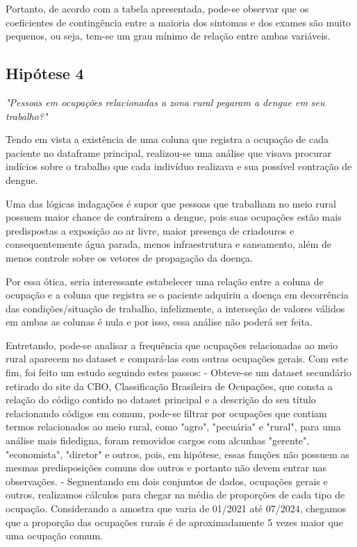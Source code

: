 \documentclass[a4paper,12pt]{article}
\begin{document}
Portanto, de acordo com a tabela apresentada, pode-se observar que os coeficientes de contingência entre a maioria dos sintomas e dos exames são muito pequenos, ou seja, tem-se um grau mínimo de relação entre ambas variáveis.


\subsection{Hipótese 4}
\emph{"Pessoas em ocupações relacionadas a zona rural pegaram a dengue em seu trabalho?"}

Tendo em vista a existência de uma coluna que registra a ocupação de cada paciente no dataframe principal, realizou-se uma análise que visava procurar indícios sobre o trabalho que cada indivíduo realizava e sua possível contração de dengue. 

Uma das lógicas indagações é supor que pessoas que trabalham no meio rural possuem maior chance de contraírem a dengue, pois suas ocupações estão mais predispostas a exposição ao ar livre, maior presença de criadouros e consequentemente água parada, menos infraestrutura e saneamento, além de menos controle sobre os vetores de propagação da doença.

Por essa ótica, seria interessante estabelecer uma relação entre a coluna de ocupação e a coluna que registra se o paciente adquiriu a doença em decorrência das condições/situação de trabalho, infelizmente, a interseção de valores válidos em ambas as colunas é nula e por isso, essa análise não poderá ser feita.

Entretando, pode-se analisar a frequência que ocupações relacionadas ao meio rural aparecem no dataset e compará-las com outras ocupações gerais. Com este fim, foi feito um estudo seguindo estes passos: 
-  Obteve-se um dataset secundário retirado do site da CBO, Classificação Brasileira de Ocupações, que consta a relação do código contido no dataset principal e a descrição do seu título relacionando códigos em comum, pode-se filtrar por ocupações que contiam termos relacionados ao meio rural, como "agro", "pecuária" e "rural", para uma análise mais fidedigna, foram removidos cargos com alcunhas "gerente", "economista", "diretor" e outros, pois, em hipótese, essas funções não possuem as mesmas predisposições comuns dos outros e portanto não devem entrar nas observações. 
- Segmentando em dois conjuntos de dados, ocupações gerais e outros, realizamos cálculos para chegar na média de proporções de cada tipo de ocupação. Considerando a amostra que varia de 01/2021 até 07/2024, chegamos que a proporção das ocupações rurais é de aproximadamente 5 vezes maior que uma ocupação comum. 
\end{document}
